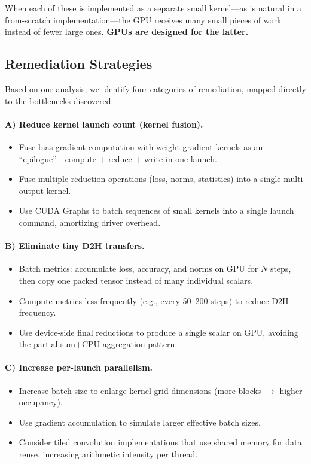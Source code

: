 \documentclass[10pt,twocolumn,letterpaper]{article}
\begin{document}
When each of these is implemented as a separate small kernel---as is natural in a from-scratch implementation---the GPU receives many small pieces of work instead of fewer large ones.
\textbf{GPUs are designed for the latter.}

\subsection{Remediation Strategies}
\label{sec:remediation}

Based on our analysis, we identify four categories of remediation, mapped directly to the bottlenecks discovered:

\paragraph{A) Reduce kernel launch count (kernel fusion).}
\begin{itemize}[nosep,leftmargin=*]
  \item Fuse bias gradient computation with weight gradient kernels as an ``epilogue''---compute + reduce + write in one launch.
  \item Fuse multiple reduction operations (loss, norms, statistics) into a single multi-output kernel.
  \item Use CUDA Graphs to batch sequences of small kernels into a single launch command, amortizing driver overhead.
\end{itemize}

\paragraph{B) Eliminate tiny D2H transfers.}
\begin{itemize}[nosep,leftmargin=*]
  \item Batch metrics: accumulate loss, accuracy, and norms on GPU for $N$ steps, then copy one packed tensor instead of many individual scalars.
  \item Compute metrics less frequently (e.g., every 50--200 steps) to reduce D2H frequency.
  \item Use device-side final reductions to produce a single scalar on GPU, avoiding the partial-sum+CPU-aggregation pattern.
\end{itemize}

\paragraph{C) Increase per-launch parallelism.}
\begin{itemize}[nosep,leftmargin=*]
  \item Increase batch size to enlarge kernel grid dimensions (more blocks $\rightarrow$ higher occupancy).
  \item Use gradient accumulation to simulate larger effective batch sizes.
  \item Consider tiled convolution implementations that use shared memory for data reuse, increasing arithmetic intensity per thread.
\end{itemize}
\end{document}
